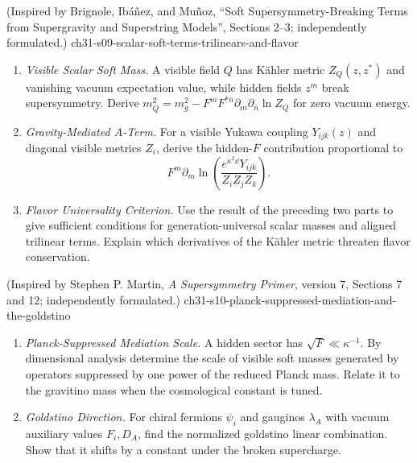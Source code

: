 \begin{enumerate}
    {(Inspired by Brignole, Ib\'a\~nez, and Mu\~noz, ``Soft Supersymmetry-Breaking Terms from Supergravity and Superstring Models'', Sections 2--3; independently formulated.)}
    {ch31-s09-scalar-soft-terms-trilinears-and-flavor}
  \begin{enumerate}
    \item \emph{Visible Scalar Soft Mass.}
    A visible field \(Q\) has Kähler metric \(Z_Q(z,z^*)\) and vanishing
      vacuum expectation value, while hidden fields \(z^m\) break
      supersymmetry.  Derive
      \(m_Q^2=m_g^2-F^mF^{*\bar n}
      \partial_m\partial_{\bar n}\ln Z_Q\) for zero vacuum energy.
    \item \emph{Gravity-Mediated \(A\)-Term.}
    For a visible Yukawa coupling \(Y_{ijk}(z)\) and diagonal visible
      metrics \(Z_i\), derive the hidden-\(F\) contribution proportional to
      \[
        F^m\partial_m
        \ln\!\left(\frac{e^{\kappa^2\dd}Y_{ijk}}
          {Z_iZ_jZ_k}\right).
      \]
    \item \emph{Flavor Universality Criterion.}
    Use the result of the preceding two parts to give sufficient
      conditions for generation-universal scalar masses and aligned
      trilinear terms.  Explain which derivatives of the Kähler metric
      threaten flavor conservation.
  \end{enumerate}

    {(Inspired by Stephen P. Martin, \emph{A Supersymmetry Primer}, version 7, Sections 7 and 12; independently formulated.)}
    {ch31-s10-planck-suppressed-mediation-and-the-goldstino}
  \begin{enumerate}
    \item \emph{Planck-Suppressed Mediation Scale.}
    A hidden sector has \(\sqrt F\ll\kappa^{-1}\).  By dimensional
      analysis determine the scale of visible soft masses generated by
      operators suppressed by one power of the reduced Planck mass.  Relate
      it to the gravitino mass when the cosmological constant is tuned.
    \item \emph{Goldstino Direction.}
    For chiral fermions \(\psi_i\) and gauginos \(\lambda_A\) with vacuum
      auxiliary values \(F_i,D_A\), find the normalized goldstino linear
      combination.  Show that it shifts by a constant under the broken
      supercharge.
  \end{enumerate}


\end{enumerate}
